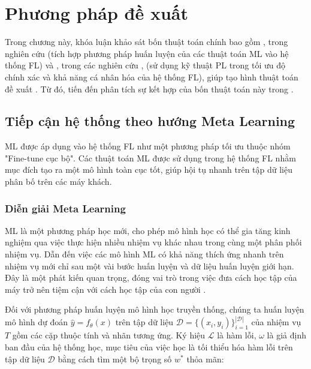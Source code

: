 \chapter{Phương pháp đề xuất}
\label{Chapter3}


Trong chương này, khóa luận khảo sát bốn thuật toán chính bao gồm ,  trong nghiên cứu \cite{chen2018federated} (tích hợp phương pháp huấn luyện của các thuật toán ML vào hệ thống FL) và ,  trong các nghiên cứu \cite{arivazhagan2019federated}, \cite{liang2020think} (sử dụng kỹ thuật PL trong tối ưu độ chính xác và khả năng cá nhân hóa của hệ thống FL), giúp tạo hình thuật toán đề xuất . Từ đó, tiến đến phân tích sự kết hợp của bốn thuật toán này trong .

\section{Tiếp cận hệ thống theo hướng Meta Learning}

ML được áp dụng vào hệ thống FL như một phương pháp tối ưu thuộc nhóm "Fine-tune cục bộ". Các thuật toán ML được sử dụng trong hệ thống FL nhằm mục đích tạo ra một mô hình toàn cục tốt, giúp hội tụ nhanh trên tập dữ liệu phân bố trên các máy khách.

\subsection{Diễn giải Meta Learning}

ML là một phương pháp học mới, cho phép mô hình học có thể gia tăng kinh nghiệm qua việc thực hiện nhiều nhiệm vụ khác nhau trong cùng một phân phối nhiệm vụ. Dẫn đến việc các mô hình ML có khả năng thích ứng nhanh trên nhiệm vụ mới chỉ sau một vài bước huấn luyện và dữ liệu huấn luyện giới hạn. Đây là một phát kiến quan trọng, đóng vai trò trong việc đưa cách học tập của máy trở nên tiệm cận với cách học tập của con người \cite{harlow1949formation}.

Đối với phương pháp huấn luyện mô hình học truyền thống, chúng ta huấn luyện mô hình dự đoán $\hat{y} = f_\theta(x)$ trên tập dữ liệu $\mathcal{D} = \{ (x_i, y_i)\}_{i=1}^{|\mathcal{D}|}$ của nhiệm vụ $T$ gồm các cặp thuộc tính và nhãn tương ứng. Ký hiệu $\mathcal{L}$ là hàm lỗi, $\omega$ là giả định ban đầu của hệ thống học, mục tiêu của việc học là tối thiểu hóa hàm lỗi trên tập dữ liệu $\mathcal{D}$ bằng cách tìm một bộ trọng số $w^*$ thỏa mãn:

